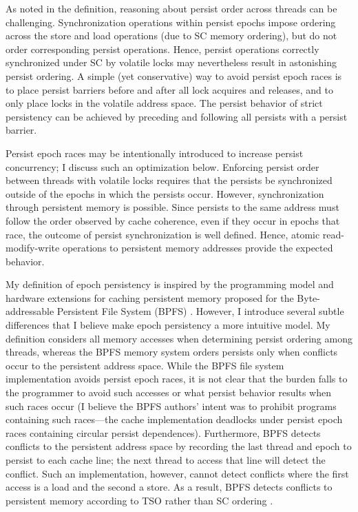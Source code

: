 As noted in the definition, reasoning about persist order across threads can be challenging.
Synchronization operations within persist epochs impose ordering across the store and load operations (due to SC memory ordering), but do not order corresponding persist operations.
Hence, persist operations correctly synchronized under SC by volatile locks may nevertheless result in astonishing persist ordering.
A simple (yet conservative) way to avoid persist epoch races is to place persist barriers before and after all lock acquires and releases, and to only place locks in the volatile address space.
The persist behavior of strict persistency can be achieved by preceding and following all persists with a persist barrier.

Persist epoch races may be intentionally introduced to increase persist concurrency; I discuss such an optimization below.
Enforcing persist order between threads with volatile locks requires that the persists be synchronized outside of the epochs in which the persists occur.
However, synchronization through persistent memory is possible.
Since persists to the same address must follow the order observed by cache coherence, even if they occur in epochs that race, the outcome of persist synchronization is well defined.
Hence, atomic read-modify-write operations to persistent memory addresses provide the expected behavior.

My definition of epoch persistency is inspired by the programming model and hardware extensions for caching persistent memory proposed for the Byte-addressable Persistent File System (BPFS) \cite{ConditNightingale09}.
However, I introduce several subtle differences that I believe make epoch persistency a more intuitive model.
My definition considers all memory accesses when determining persist ordering among threads, whereas the BPFS memory system orders persists only when conflicts occur to the persistent address space.
While the BPFS file system implementation avoids persist epoch races, it is not clear that the burden falls to the programmer to avoid such accesses or what persist behavior results when such races occur (I believe the BPFS authors' intent was to prohibit programs containing such races---the cache implementation deadlocks under persist epoch races containing circular persist dependences).  
Furthermore, BPFS detects conflicts to the persistent address space by recording the last thread and epoch to persist to each cache line; the next thread to access that line will detect the conflict.
Such an implementation, however, cannot detect conflicts where the first access is a load and the second a store.
As a result, BPFS detects conflicts to persistent memory according to TSO rather than SC ordering \cite{SPARCv9}.

